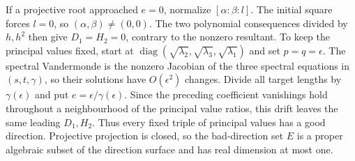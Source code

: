 \documentclass[11pt,a4paper]{article}
\numberwithin{equation}{section}
\theoremstyle{plain}
\theoremstyle{definition}
\theoremstyle{remark}
\begin{document}
If a projective root approached $e=0$, normalize $[\alpha:\beta:l]$.
The initial square forces $l=0$, so $(\alpha,\beta)\ne(0,0)$.
The two polynomial consequences divided by $h,h^2$ then give
$D_1=H_2=0$, contrary to the nonzero resultant. To keep the principal values fixed, start at
$\operatorname{diag}(\sqrt{\lambda_2},\sqrt{\lambda_3},\sqrt{\lambda_1})$
and set $p=q=\epsilon$.  The spectral Vandermonde is the nonzero Jacobian
of the three spectral equations in $(s,t,\gamma)$, so their solutions have
$O(\epsilon^2)$ changes.  Divide all target lengths by $\gamma(\epsilon)$ and
put $e=\epsilon/\gamma(\epsilon)$.  Since the preceding coefficient vanishings
hold throughout a neighbourhood of the principal value ratios, this drift leaves the same
leading $D_1,H_2$.  Thus every fixed triple of principal values has a good direction.
Projective projection is closed, so the bad-direction set $E$ is a proper
algebraic subset of the direction surface and has real dimension at most one.
\end{document}
